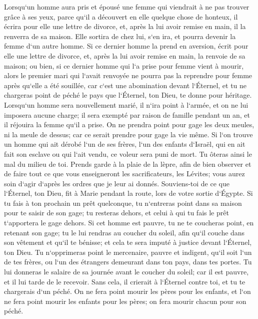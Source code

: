 \verse Lorsqu`un homme aura pris et épousé une femme qui viendrait à ne pas trouver grâce à ses yeux, parce qu`il a découvert en elle quelque chose de honteux, il écrira pour elle une lettre de divorce, et, après la lui avoir remise en main, il la renverra de sa maison. 
\verse Elle sortira de chez lui, s`en ira, et pourra devenir la femme d`un autre homme. 
\verse Si ce dernier homme la prend en aversion, écrit pour elle une lettre de divorce, et, après la lui avoir remise en main, la renvoie de sa maison; ou bien, si ce dernier homme qui l`a prise pour femme vient à mourir, 
\verse alors le premier mari qui l`avait renvoyée ne pourra pas la reprendre pour femme après qu`elle a été souillée, car c`est une abomination devant l`Éternel, et tu ne chargeras point de péché le pays que l`Éternel, ton Dieu, te donne pour héritage. 
\verse Lorsqu`un homme sera nouvellement marié, il n`ira point à l`armée, et on ne lui imposera aucune charge; il sera exempté par raison de famille pendant un an, et il réjouira la femme qu`il a prise. 
\verse On ne prendra point pour gage les deux meules, ni la meule de dessus; car ce serait prendre pour gage la vie même. 
\verse Si l`on trouve un homme qui ait dérobé l`un de ses frères, l`un des enfants d`Israël, qui en ait fait son esclave ou qui l`ait vendu, ce voleur sera puni de mort. Tu ôteras ainsi le mal du milieu de toi. 
\verse Prends garde à la plaie de la lèpre, afin de bien observer et de faire tout ce que vous enseigneront les sacrificateurs, les Lévites; vous aurez soin d`agir d`après les ordres que je leur ai donnés. 
\verse Souviens-toi de ce que l`Éternel, ton Dieu, fit à Marie pendant la route, lors de votre sortie d`Égypte. 
\verse Si tu fais à ton prochain un prêt quelconque, tu n`entreras point dans sa maison pour te saisir de son gage; 
\verse tu resteras dehors, et celui à qui tu fais le prêt t`apportera le gage dehors. 
\verse Si cet homme est pauvre, tu ne te coucheras point, en retenant son gage; 
\verse tu le lui rendras au coucher du soleil, afin qu`il couche dans son vêtement et qu`il te bénisse; et cela te sera imputé à justice devant l`Éternel, ton Dieu. 
\verse Tu n`opprimeras point le mercenaire, pauvre et indigent, qu`il soit l`un de tes frères, ou l`un des étrangers demeurant dans ton pays, dans tes portes. 
\verse Tu lui donneras le salaire de sa journée avant le coucher du soleil; car il est pauvre, et il lui tarde de le recevoir. Sans cela, il crierait à l`Éternel contre toi, et tu te chargerais d`un péché. 
\verse On ne fera point mourir les pères pour les enfants, et l`on ne fera point mourir les enfants pour les pères; on fera mourir chacun pour son péché. 

